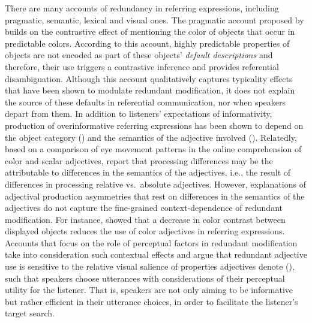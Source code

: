 \documentclass[12pt,letterpaper]{article}
\begin{document}
There are many accounts of redundancy in referring expressions, including pragmatic, semantic, lexical and visual ones. The pragmatic account proposed by \citet{Sedivy2003} builds on the contrastive effect of mentioning the color of objects that occur in predictable colors. According to this account, highly predictable properties of objects are not encoded as part of these objects' \emph{default descriptions} and therefore, their use triggers a contrastive inference and provides referential disambiguation. Although this account qualitatively captures typicality effects that have been shown to modulate redundant modification, it does not explain the source of these defaults in referential communication, nor when speakers depart from them. In addition to listeners' expectations of informativity, production of overinformative referring expressions has been shown to depend on the object category (\citealt{RubioFernandez2016}) and the semantics of the adjective involved (\citealt{RubioEtAl2019, Sedivy2003}). Relatedly, based on a comparison of eye movement patterns in the online comprehension of color and scalar adjectives, \citet{AparicioEtAl2018} report that processing  differences may be the attributable to differences in the semantics of the adjectives, i.e., the result of differences in processing relative vs.~absolute adjectives. However, explanations of adjectival production asymmetries that rest on differences in the semantics of the adjectives do not capture the fine-grained context-dependence of redundant modification. For instance, \citet{ViethenEtAl2017} showed that  a decrease in color contrast between displayed objects reduces the use of color adjectives in referring expressions. Accounts that focus on the role of perceptual factors in redundant modification take into consideration such contextual effects and argue that redundant adjective use is sensitive to the relative visual salience of properties  adjectives denote (\citealt{Taranskeen2015, RubioEtAl2019, EttingerFernandez2020}), such that speakers choose utterances with considerations of their perceptual utility for the listener. That is, speakers are not only aiming to be informative but rather efficient in their utterance choices, in order to facilitate the listener's target search. 
\end{document}
